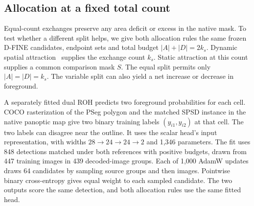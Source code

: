 \documentclass[journal]{IEEEtran}
\begin{document}
\subsection{Allocation at a fixed total count}
\label{sec:variable-sign}

Equal-count exchanges preserve any area deficit or excess in the native mask. To test whether a different split helps, we give both allocation rules the same frozen D-FINE candidates, endpoint sets and total budget \(|A|+|D|=2k_s\). Dynamic spatial attraction~\cite{atkinson} supplies the exchange count \(k_s\). Static attraction at this count supplies a common comparison mask \(S\). The equal split permits only \(|A|=|D|=k_s\). The variable split can also yield a net increase or decrease in foreground.

A separately fitted dual ROH predicts two foreground probabilities for each cell. COCO rasterization of the PSeg polygon and the matched SPSD instance in the native panoptic map give two binary training labels \((y_{i1},y_{i2})\) at that cell. The two labels can disagree near the outline. It uses the scalar head's input representation, with widths \(28\to24\to24\to2\) and 1,346 parameters. The fit uses 848 detections matched under both references with positive budgets, drawn from 447 training images in 439 decoded-image groups. Each of 1,000 AdamW updates draws 64 candidates by sampling source groups and then images. Pointwise binary cross-entropy gives equal weight to each sampled candidate. The two outputs score the same detection, and both allocation rules use the same fitted head.
\end{document}
